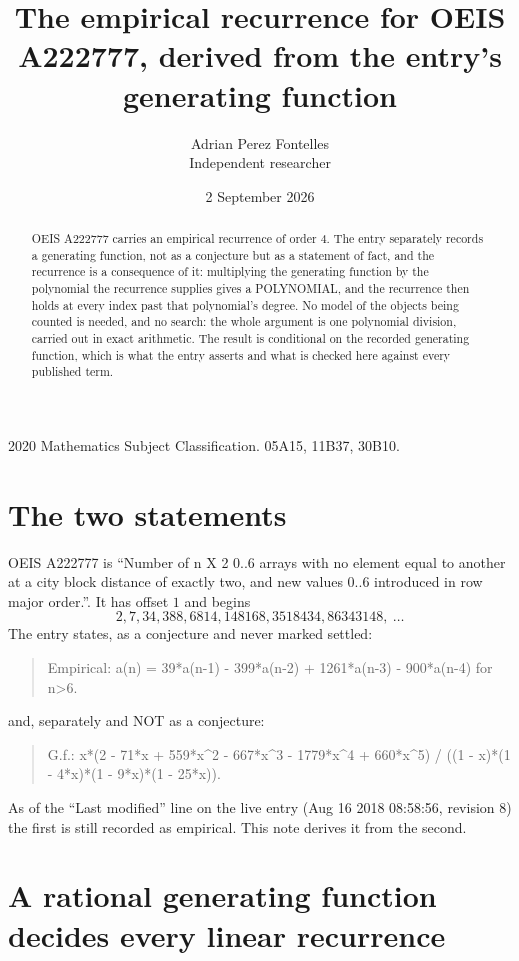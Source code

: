 \documentclass[11pt,a4paper]{article}
\title{The empirical recurrence for OEIS A222777, derived from the entry's generating function}
\author{Adrian Perez Fontelles\\ \small Independent researcher}
\date{2 September 2026}
\theoremstyle{plain}
\theoremstyle{definition}
\begin{document}
\maketitle

\begin{abstract}
OEIS A222777 carries an empirical recurrence of order $4$. The entry separately records a
generating function, not as a conjecture but as a statement of fact, and the recurrence is a
consequence of it: multiplying the generating function by the polynomial the recurrence
supplies gives a POLYNOMIAL, and the recurrence then holds at every index past that
polynomial's degree. No model of the objects being counted is needed, and no search: the
whole argument is one polynomial division, carried out in exact arithmetic. The result is
conditional on the recorded generating function, which is what the entry asserts and what is
checked here against every published term.
\end{abstract}

\noindent\small 2020 Mathematics Subject Classification. 05A15, 11B37, 30B10.\normalsize

\section{The two statements}

OEIS A222777 is ``Number of n X 2 0..6 arrays with no element equal to another at a city block distance of exactly two, and new values 0..6 introduced in row major order.''. It has offset $1$ and begins
\[
2, 7, 34, 388, 6814, 148168, 3518434, 86343148,\ \dots
\]
The entry states, as a conjecture and never marked settled:
\begin{quote}
Empirical: a(n) = 39*a(n-1) - 399*a(n-2) + 1261*a(n-3) - 900*a(n-4) for n>6.
\end{quote}
and, separately and NOT as a conjecture:
\begin{quote}
G.f.: x*(2 - 71*x + 559*x\^{}2 - 667*x\^{}3 - 1779*x\^{}4 + 660*x\^{}5) / ((1 - x)*(1 - 4*x)*(1 - 9*x)*(1 - 25*x)).
\end{quote}
As of the ``Last modified'' line on the live entry (Aug 16 2018 08:58:56, revision 8) the first is still
recorded as empirical. This note derives it from the second.

\section{A rational generating function decides every linear recurrence}
\end{document}
